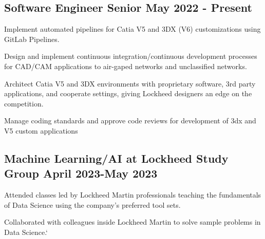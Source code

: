 \subsection{{Software Engineer Senior \hfill May 2022 - Present}}
\begin{zitemize}
\item Implement automated pipelines for Catia V5 and 3DX (V6) customizations using GitLab Pipelines.
\item Design and implement continuous integration/continuous development  processes for CAD/CAM applications to air-gaped networks and unclassified networks.\\
\item Architect Catia V5 and 3DX environments with proprietary software, 3rd party applications, and cooperate settings, giving Lockheed designers an edge on the competition. 
\item Manage coding standards and approve code reviews for development of 3dx and V5 custom applications\\

\end{zitemize}

\subsection{{Machine Learning/AI at Lockheed Study Group \hfill April 2023-May 2023}}
\begin{zitemize}
\item Attended classes led by Lockheed Martin professionals teaching the fundamentals of Data Science using the company's preferred tool sets.
\item Collaborated with colleagues inside Lockheed Martin to solve sample problems in Data Science.`
\end{zitemize}

